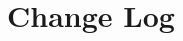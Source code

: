 \documentclass[9pt, openany]{extbook}
\begin{document}











\appendix

\chapter{Change Log}
\label{changelog}
\end{document}
